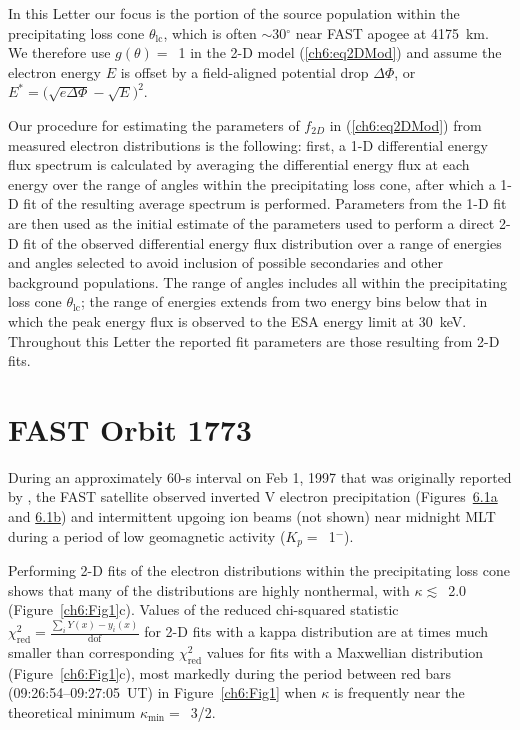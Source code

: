 
  In this Letter our focus is the portion of the source population
  within the precipitating loss cone $\theta_{\textrm{lc}}$, which is
  often $\sim$30$^\circ$ near FAST apogee at 4175~km. We therefore use
  $g(\theta) =$~1 in the 2-D model (\ref{ch6:eq2DMod}) and assume the
  electron energy $E$ is offset by a field-aligned potential drop
  $\Delta \Phi$, or $E^* = \big( \sqrt{e \Delta \Phi} - \sqrt{E}
  \big)^2$.

  Our procedure for estimating the parameters of $f_{2D}$ in
  (\ref{ch6:eq2DMod}) from measured electron distributions is the
  following: first, a 1-D differential energy flux spectrum is
  calculated by averaging the differential energy flux at each energy
  over the range of angles within the precipitating loss cone, after
  which a 1-D fit of the resulting average spectrum is
  performed. Parameters from the 1-D fit are then used as the initial
  estimate of the parameters used to perform a direct 2-D fit of the
  observed differential energy flux distribution over a range of
  energies and angles selected to avoid inclusion of possible
  secondaries and other background populations. The range of angles
  includes all within the precipitating loss cone
  $\theta_{\textrm{lc}}$; the range of energies extends from two
  energy bins below that in which the peak energy flux is observed to
  the ESA energy limit at 30~keV. Throughout this Letter the reported
  fit parameters are those resulting from 2-D fits.

  \section{FAST Orbit 1773}

  During an approximately 60-s interval on Feb 1, 1997 that was
  originally reported by \citet{Elphic1998}, the FAST satellite
  observed inverted V electron precipitation
  (Figures~\hyperref[ch6:Fig1]{6.1a} and \hyperref[ch6:Fig1]{6.1b})
  and intermittent upgoing ion beams (not shown) near midnight MLT
  during a period of low geomagnetic activity ($K_p =$~1$^-$).

  Performing 2-D fits of the electron distributions within the
  precipitating loss cone shows that many of the distributions are
  highly nonthermal, with $\kappa \lesssim$~2.0
  (Figure~\ref{ch6:Fig1}c). Values of the reduced chi-squared
  statistic $\chi^2_{\mathrm{red}} = \frac{\sum_i Y(x) -
    y_i(x)}{\mathrm{dof}}$ for 2-D fits with a kappa distribution are
  at times much smaller than corresponding $\chi^2_{\textrm{red}}$
  values for fits with a Maxwellian distribution
  (Figure~\ref{ch6:Fig1}c), most markedly during the period between
  red bars (09:26:54--09:27:05~UT) in Figure~\ref{ch6:Fig1} when
  $\kappa$ is frequently near the theoretical minimum
  $\kappa_{\mathrm{min}} =$~3/2.

